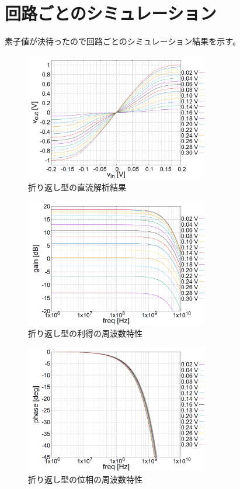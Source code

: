 \documentclass[twocolumn]{jsarticle}
\begin{document}
\section{回路ごとのシミュレーション}
    素子値が決待ったので回路ごとのシミュレーション結果を示す。
    \begin{figure}[H]
        \begin{center}
            \includegraphics*[width = 80mm]{figures/NtoN_dc.PNG}
            \caption{折り返し型の直流解析結果}
            \label{fig:sim_NtoN_dc}
        \end{center}
    \end{figure}
    \begin{figure}[H]
        \begin{center}
            \includegraphics*[width = 80mm]{figures/NtoN_ac_gain.PNG}
            \caption{折り返し型の利得の周波数特性}
            \label{fig:sim_NtoN_ac_gain}
        \end{center}
    \end{figure}
    \begin{figure}[H]
        \begin{center}
            \includegraphics*[width = 80mm]{figures/NtoN_ac_phase.PNG}
            \caption{折り返し型の位相の周波数特性}
            \label{fig:sim_NtoN_ac_phase}
        \end{center}
    \end{figure}
\end{document}
